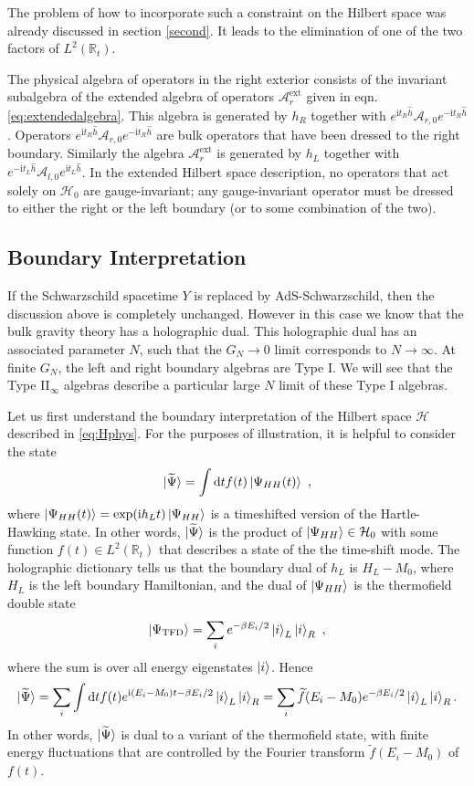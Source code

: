 \documentclass[11pt,a4paper]{article}
\def\be{\begin{equation}}
\def\ee{\end{equation}}
\def\tilde{\widetilde}
\def\h{\widehat}
\def\A{{\mathcal A}}
\def\d{{\mathrm d}}
\def\R{{\mathbb R}}
\def\h{\widehat}
\def\tilde{\widetilde}
\def\i{{\mathrm i}}
\def\TFD{{\mathrm{TFD}}}
\begin{document}
The problem of how to incorporate such a constraint on the Hilbert space was already discussed in section \ref{second}. It leads to the elimination of one of the two factors of $L^2(\R_t)$.

The physical algebra of operators in the right exterior consists of the invariant subalgebra of the extended algebra of operators $\A_r^{\mathrm{ext}}$ given in eqn. \eqref{eq:extendedalgebra}. This algebra is generated by $h_R$ together with $ e^{\i t_R \h h}\A_{r,0} e^{-\i t_R \h h}$.
Operators $ e^{\i t_R \h h}\A_{r,0} e^{-\i t_R \h h}$ are
 bulk operators that have been dressed to the right boundary. Similarly the algebra $\A_r^{\mathrm{ext}}$ is generated by $h_L$ together with $ e^{-\i t_L \h h}\A_{l,0} e^{\i t_L \h h}$. In the extended Hilbert space description, no operators that act solely on $\mathcal{H}_0$ are gauge-invariant; any gauge-invariant operator must be dressed to either the right or the left boundary (or to some combination of the two).

\subsection{Boundary Interpretation}

If the Schwarzschild spacetime $Y$ is replaced by AdS-Schwarzschild, then the discussion above is completely unchanged.  However in this case we know that the bulk gravity theory has a holographic dual. This holographic dual has an associated parameter $N$, such that the $G_N \to 0$ limit corresponds to $N \to \infty$. At finite $G_N$, the left and right boundary algebras are Type I. We will see that the Type II$_\infty$ algebras describe a particular large $N$ limit of these Type I algebras.

Let us first understand the boundary interpretation of the Hilbert space $\mathcal{H}$ described in \eqref{eq:Hphys}. For the purposes of illustration, it is helpful to consider the state
$$
\ket{\tilde \Psi} = \int \d t f(t) \ket{\Psi_{HH}(t)}~,
$$
where $\ket{\Psi_{HH}(t)} = \exp(\i h_L t) \ket{\Psi_{HH}}$ is a timeshifted version of the Hartle-Hawking state. In other words, $\ket{\tilde \Psi}$ is the product of $\ket{\Psi_{HH}} \in \mathcal{H}_0$ with some function $f(t) \in L^2(\R_t)$ that describes a state of the  the time-shift mode. The holographic dictionary tells us that the boundary dual of $h_L$ is $H_L - M_0$, where $H_L$ is the left boundary Hamiltonian, and the dual of $\ket{\Psi_{HH}}$ is the thermofield double state
\be
\ket{\Psi_\TFD} = \sum_i e^{-\beta E_i/2} \ket{i}_L \ket{i}_R~,
\ee
where the sum is over all energy eigenstates $\ket{i}$. Hence
\be \label{eq:microTFD}
\ket{\tilde \Psi} = \sum_i  \int \d t f(t)  e^{\i (E_i - M_0) t -\beta E_i/2} \ket{i}_L \ket{i}_R = \sum_i \tilde f(E_i - M_0) e^{-\beta E_i/2} \ket{i}_L \ket{i}_R.
\ee
In other words, $\ket{\tilde \Psi}$ is dual to a variant of the thermofield state, with finite energy fluctuations that are controlled by the Fourier transform $\tilde f(E_i - M_0)$ of $f(t)$.
\end{document}

